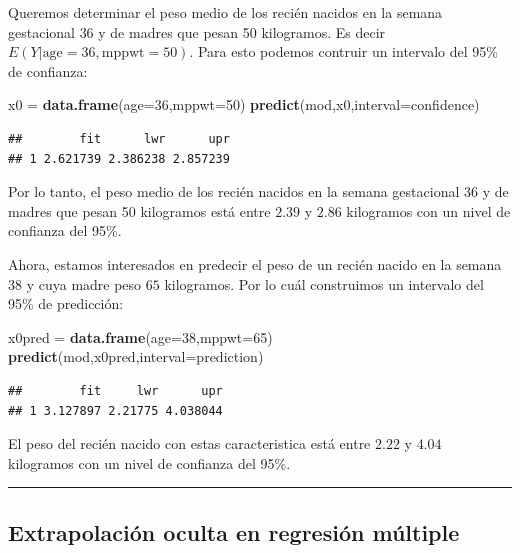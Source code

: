 \documentclass[
]{article}
\newenvironment{Shaded}{\begin{snugshade}}{\end{snugshade}}
\newcommand{\AttributeTok}[1]{\textcolor[rgb]{0.13,0.29,0.53}{#1}}
\newcommand{\DecValTok}[1]{\textcolor[rgb]{0.00,0.00,0.81}{#1}}
\newcommand{\FunctionTok}[1]{\textcolor[rgb]{0.13,0.29,0.53}{\textbf{#1}}}
\newcommand{\NormalTok}[1]{#1}
\newcommand{\OtherTok}[1]{\textcolor[rgb]{0.56,0.35,0.01}{#1}}
\newcommand{\StringTok}[1]{\textcolor[rgb]{0.31,0.60,0.02}{#1}}
\begin{document}
Queremos determinar el peso medio de los recién nacidos en la semana gestacional \(36\) y de madres que pesan 50 kilogramos. Es decir \(E(Y|\mbox{age}=36, \mbox{mppwt}=50)\). Para esto podemos contruir un intervalo del 95\% de confianza:

\begin{Shaded}
\begin{Highlighting}[]
\NormalTok{x0 }\OtherTok{=} \FunctionTok{data.frame}\NormalTok{(}\AttributeTok{age=}\DecValTok{36}\NormalTok{,}\AttributeTok{mppwt=}\DecValTok{50}\NormalTok{)}
\FunctionTok{predict}\NormalTok{(mod,x0,}\AttributeTok{interval=}\StringTok{\textquotesingle{}confidence\textquotesingle{}}\NormalTok{)}
\end{Highlighting}
\end{Shaded}

\begin{verbatim}
##        fit      lwr      upr
## 1 2.621739 2.386238 2.857239
\end{verbatim}

Por lo tanto, el peso medio de los recién nacidos en la semana gestacional 36 y de madres que pesan 50 kilogramos está entre \(2.39\) y \(2.86\) kilogramos con un nivel de confianza del 95\%.

Ahora, estamos interesados en predecir el peso de un recién nacido en la semana \(38\) y cuya madre peso \(65\) kilogramos. Por lo cuál construimos un intervalo del 95\% de predicción:

\begin{Shaded}
\begin{Highlighting}[]
\NormalTok{x0pred }\OtherTok{=} \FunctionTok{data.frame}\NormalTok{(}\AttributeTok{age=}\DecValTok{38}\NormalTok{,}\AttributeTok{mppwt=}\DecValTok{65}\NormalTok{)}
\FunctionTok{predict}\NormalTok{(mod,x0pred,}\AttributeTok{interval=}\StringTok{\textquotesingle{}prediction\textquotesingle{}}\NormalTok{)}
\end{Highlighting}
\end{Shaded}

\begin{verbatim}
##        fit     lwr      upr
## 1 3.127897 2.21775 4.038044
\end{verbatim}

El peso del recién nacido con estas caracteristica está entre \(2.22\) y \(4.04\) kilogramos con un nivel de confianza del 95\%.

\rule{\textwidth}{0.4pt}

\hypertarget{extrapolaciuxf3n-oculta-en-regresiuxf3n-muxfaltiple}{%
\subsection{Extrapolación oculta en regresión múltiple}\label{extrapolaciuxf3n-oculta-en-regresiuxf3n-muxfaltiple}}
\end{document}
